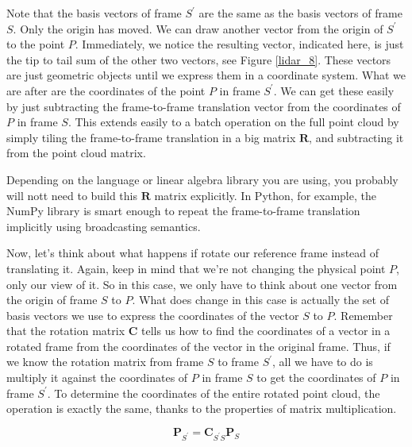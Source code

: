Note that the basis vectors of frame $S^{'}$ are the same as the basis vectors of frame $S$. Only the origin has moved. We can draw another vector from
the origin of $S^{'}$ to the point $P$. Immediately, we notice the resulting vector, indicated here, is just the tip to
tail sum of the other two vectors, see Figure \ref{lidar_8}. These vectors are just geometric
objects until we express them in a coordinate system. What we are after are the coordinates
of the point $P$ in frame $S^{'}$. We can get these easily by just subtracting the frame-to-frame translation vector from
the coordinates of $P$ in frame $S$. This extends easily to a batch operation
on the full point cloud by simply tiling the frame-to-frame translation
in a big matrix $\mathbf{R}$, and subtracting it from
the point cloud matrix. 

\begin{framed}
\theoremstyle{remark}
\begin{remark}{}

Depending on the language or
linear algebra library you are using, you probably will nott need to
build this $\mathbf{R}$ matrix explicitly. In Python, for example, the NumPy
library is smart enough to repeat the frame-to-frame translation
implicitly using broadcasting semantics.
\end{remark}
\end{framed}

Now, let's think about what happens if rotate our reference frame instead of translating it. Again, keep in mind that we're not
changing the physical point $P$, only our view of it. So in this case, we only have to think about one vector
from the origin of frame $S$ to $P$. What does change in this case is actually
the set of basis vectors we use to express the coordinates
of the vector $S$ to $P$. Remember that the rotation matrix $\mathbf{C}$ tells
us how to find the coordinates of a vector in a rotated frame from the coordinates
of the vector in the original frame. Thus, if we know the rotation matrix
from frame $S$ to frame $S^{'}$, all we have to do is multiply it
against the coordinates of $P$ in frame $S$ to get the coordinates
of $P$ in frame  $S^{'}$. To determine the coordinates of the entire
rotated point cloud, the operation is exactly the same, thanks to
the properties of matrix multiplication. 

\begin{equation}
\mathbf{P}_{S^{'}} = \mathbf{C}_{S^{'}S} \mathbf{P}_{S}
\end{equation}


